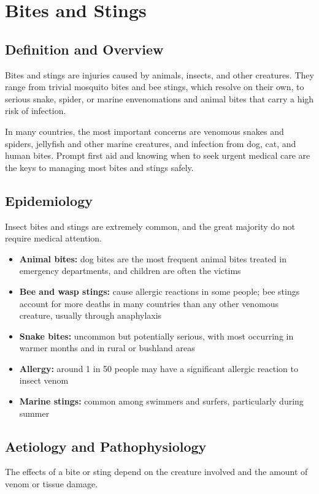 \chapter{Bites and Stings}

\section*{Definition and Overview}
Bites and stings are injuries caused by animals, insects, and other creatures. They range from trivial mosquito bites and bee stings, which resolve on their own, to serious snake, spider, or marine envenomations and animal bites that carry a high risk of infection.

In many countries, the most important concerns are venomous snakes and spiders, jellyfish and other marine creatures, and infection from dog, cat, and human bites. Prompt first aid and knowing when to seek urgent medical care are the keys to managing most bites and stings safely.

\section*{Epidemiology}
Insect bites and stings are extremely common, and the great majority do not require medical attention.

\begin{itemize}
    \item \textbf{Animal bites:} dog bites are the most frequent animal bites treated in emergency departments, and children are often the victims
    \item \textbf{Bee and wasp stings:} cause allergic reactions in some people; bee stings account for more deaths in many countries than any other venomous creature, usually through anaphylaxis
    \item \textbf{Snake bites:} uncommon but potentially serious, with most occurring in warmer months and in rural or bushland areas
    \item \textbf{Allergy:} around 1 in 50 people may have a significant allergic reaction to insect venom
    \item \textbf{Marine stings:} common among swimmers and surfers, particularly during summer
\end{itemize}

\section*{Aetiology and Pathophysiology}
The effects of a bite or sting depend on the creature involved and the amount of venom or tissue damage.

